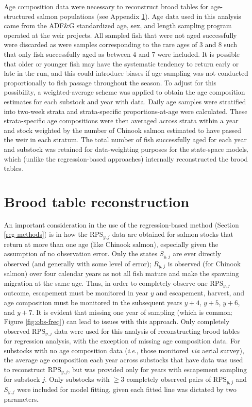 \documentclass[12pt,]{book}
\theoremstyle{definition}
\theoremstyle{definition}
\theoremstyle{definition}
\theoremstyle{remark}
\begin{document}
\noindent
Age composition data were necessary to reconstruct brood tables for
age-structured salmon populations (see Appendix \ref{lm-btable}). Age
data used in this analysis came from the ADF\&G standardized age, sex,
and length sampling program operated at the weir projects. All sampled
fish that were not aged successfully were discarded as were samples
corresponding to the rare ages of 3 and 8 such that only fish
successfully aged as between 4 and 7 were included. It is possible that
older or younger fish may have the systematic tendency to return early
or late in the run, and this could introduce biases if age sampling was
not conducted proportionally to fish passage throughout the season. To
adjust for this possibility, a weighted-average scheme was applied to
obtain the age composition estimates for each substock and year with
data. Daily age samples were stratified into two-week strata and
strata-specific proportions-at-age were calculated. These
strata-specific age compositions were then averaged across strata within
a year and stock weighted by the number of Chinook salmon estimated to
have passed the weir in each stratum. The total number of fish
successfully aged for each year and substock was retained for
data-weighting purposes for the state-space models, which (unlike the
regression-based approaches) internally reconstructed the brood tables.

\section{Brood table reconstruction}\label{lm-btable}

\noindent
An important consideration in the use of the regression-based method
(Section \ref{reg-methods}) is in how the \(\text{RPS}_{y,j}\) data are
obtained for salmon stocks that return at more than one age (like
Chinook salmon), especially given the assumption of no observation
error. Only the states \(S_{y,j}\) are ever directly observed (and
generally with some level of error); \(R_{y,j}\) is observed (for
Chinook salmon) over four calendar years as not all fish mature and make
the spawning migration at the same age. Thus, in order to completely
observe one \(\text{RPS}_{y,j}\) outcome, escapement must be monitored
in year \(y\) and escapement, harvest, and age composition must be
monitored in the subsequent years \(y+4\), \(y+5\), \(y+6\), and
\(y+7\). It is evident that missing one year of sampling (which is
common; Figure \ref{fig:obs-freq}) can lead to issues with this
approach. Only completely observed \(\text{RPS}_{y,j}\) data were used
for this analysis of reconstructing brood tables for regression
analysis, with the exception of missing age composition data. For
substocks with no age composition data (\emph{i}.\emph{e}., those
monitored \emph{via} aerial survey), the average age composition each
year across substocks that have data was used to reconstruct
\(\text{RPS}_{y,j}\), but was provided only for years with escapement
sampling for substock \(j\). Only substocks with \(\ge3\) completely
observed pairs of \(\text{RPS}_{y,j}\) and \(S_{y,j}\) were included for
model fitting, given each fitted line was dictated by two parameters.
\end{document}
